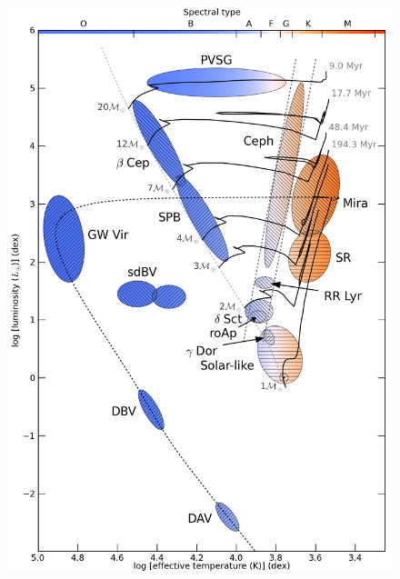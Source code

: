

\begin{figure}[htbp]
    \centering
    \includegraphics[height=0.5\paperheight]{Chapter1/HR_pulsational.png}
    \caption[Pulsational Hertzsprung-Russell Diagram]{}
    \label{fig:HRdiag}
\end{figure}


